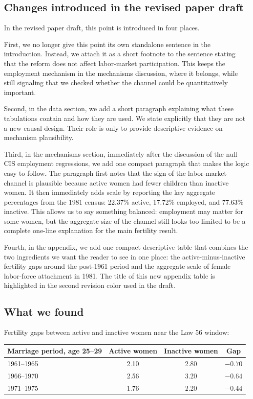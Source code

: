 \documentclass[11pt]{article}
\begin{document}
\subsection*{Changes introduced in the revised paper draft}

In the revised paper draft, this point is introduced in four places.

First, we no longer give this point its own standalone sentence in the introduction. Instead, we attach it as a short footnote to the sentence stating that the reform does not affect labor-market participation. This keeps the employment mechanism in the mechanisms discussion, where it belongs, while still signaling that we checked whether the channel could be quantitatively important.

Second, in the data section, we add a short paragraph explaining what these tabulations contain and how they are used. We state explicitly that they are not a new causal design. Their role is only to provide descriptive evidence on mechanism plausibility.

Third, in the mechanisms section, immediately after the discussion of the null CIS employment regressions, we add one compact paragraph that makes the logic easy to follow. The paragraph first notes that the sign of the labor-market channel is plausible because active women had fewer children than inactive women. It then immediately adds scale by reporting the key aggregate percentages from the 1981 census: 22.37\% active, 17.72\% employed, and 77.63\% inactive. This allows us to say something balanced: employment may matter for some women, but the aggregate size of the channel still looks too limited to be a complete one-line explanation for the main fertility result.

Fourth, in the appendix, we add one compact descriptive table that combines the two ingredients we want the reader to see in one place: the active-minus-inactive fertility gaps around the post-1961 period and the aggregate scale of female labor-force attachment in 1981. The title of this new appendix table is highlighted in the second revision color used in the draft.

\subsection*{What we found}

Fertility gaps between active and inactive women near the Law 56 window:

\begin{center}
\begin{tabular}{lccc}
\toprule
Marriage period, age 25--29 & Active women & Inactive women & Gap \\
\midrule
1961--1965 & 2.10 & 2.80 & $-0.70$ \\
1966--1970 & 2.56 & 3.20 & $-0.64$ \\
1971--1975 & 1.76 & 2.20 & $-0.44$ \\
\bottomrule
\end{tabular}
\end{center}
\end{document}
